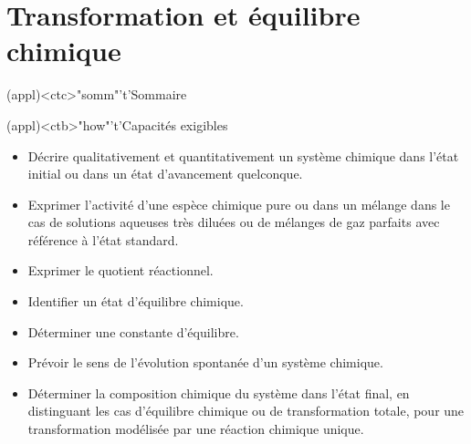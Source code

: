 \documentclass[../../main/main.tex]{subfiles}
\begin{document}
\setcounter{chapter}{1}


\chapter{Transformation et \'equilibre chimique}

\vspace*{\fill}

\begin{tcn}(appl)<ctc>"somm"'t'{Sommaire}
	\let\item\olditem
	\vspace{-15pt}
	\minitoc
	\vspace{-25pt}
\end{tcn}

\begin{tcn}[sidebyside](appl)<ctb>"how"'t'{Capacités exigibles}
	\begin{itemize}[label=\rcheck]
		\item Décrire qualitativement et quantitativement un
		      système chimique dans l'état initial ou dans un état d'avancement
		      quelconque.
		\item Exprimer l'activité d'une espèce chimique pure ou
		      dans un mélange dans le cas de solutions aqueuses très diluées ou de
		      mélanges de gaz parfaits avec référence à l'état standard.
		\item Exprimer le quotient réactionnel.
	\end{itemize}
	\tcblower
	\begin{itemize}[label=\rcheck]
		\item Identifier un état d'équilibre chimique.
		\item Déterminer une constante d'équilibre.
		\item Prévoir le sens de l'évolution spontanée d'un système chimique.
		\item Déterminer la composition chimique du système dans l'état final, en
		      distinguant les cas d'équilibre chimique ou de transformation totale,
		      pour une transformation modélisée par une réaction chimique unique.
	\end{itemize}
\end{tcn}

\vspace*{\fill}
\newpage
\vspace*{\fill}
\end{document}
